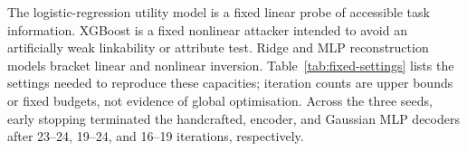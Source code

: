 \documentclass[journal]{IEEEtran}
\begin{document}
\begin{table}[ht]
\centering
\scriptsize
\setlength{\tabcolsep}{2.4pt}
\caption{Development checks used to select the configuration.}
\label{tab:configuration-evidence}
\end{table}

The logistic-regression utility model is a fixed linear probe of accessible
task information. XGBoost is a fixed nonlinear attacker intended to avoid an
artificially weak linkability or attribute test. Ridge and MLP reconstruction
models bracket linear and nonlinear inversion. Table~\ref{tab:fixed-settings}
lists the settings needed to reproduce these capacities; iteration counts are
upper bounds or fixed budgets, not evidence of global optimisation.
Across the three seeds, early stopping terminated the handcrafted, encoder, and
Gaussian MLP decoders after 23--24, 19--24, and 16--19 iterations,
respectively.
\end{document}
